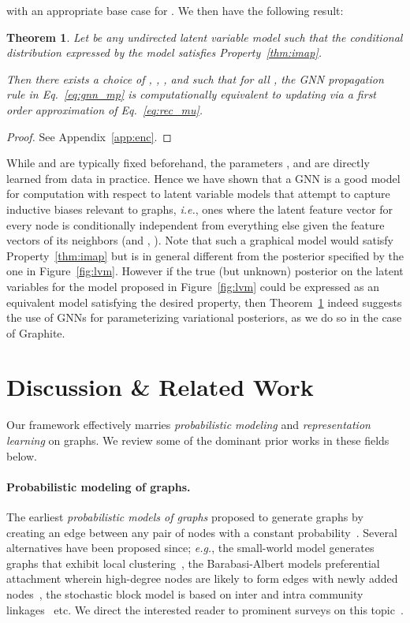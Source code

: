 \documentclass{article}
\newcommand{\name}{Graphite}
\newtheorem{theorem}{Theorem}
\begin{document}
with an appropriate base case for  . 
We then have the following result:

\begin{theorem}\label{thm:gnn_imap}
Let  be any undirected latent variable model such that the conditional distribution  expressed by the model satisfies Property~\ref{thm:imap}. 

Then there exists a choice of , , 
, 
and  such that for all , the GNN propagation rule in Eq.~\eqref{eq:gnn_mp} is computationally equivalent to updating  via a first order approximation of Eq.~\eqref{eq:rec_mu}.  
\end{theorem}
\begin{proof}
See Appendix~\ref{app:enc}.
\end{proof}

While  and  are typically fixed beforehand, the parameters , 
and  are directly learned from data in practice. Hence we have shown that a GNN is a good model for computation with respect to latent variable models that attempt to capture inductive biases relevant to graphs, \textit{i.e.}, ones where the latent feature vector for every node is conditionally independent from everything else given the feature vectors of its neighbors (and , ). Note that such a graphical model would satisfy Property~\ref{thm:imap} but is in general different from the posterior specified by the one in Figure~\ref{fig:lvm}. However if the true (but unknown) posterior on the latent variables for the model proposed in Figure~\ref{fig:lvm} could be expressed as an equivalent model satisfying the desired property, then Theorem~\ref{thm:gnn_imap} indeed suggests the use of GNNs for parameterizing variational posteriors, as we do so in the case of \name{}.
 \section{Discussion \& Related Work}\label{sec:related}


Our framework effectively marries \textit{probabilistic modeling} and  \textit{representation learning} on graphs. We review some of the dominant prior works in these fields below.

\paragraph{Probabilistic modeling of graphs.}
The earliest \textit{probabilistic models of graphs} proposed to generate graphs by creating an edge between any pair of nodes with a constant probability~\citep{erdos1959random}. Several alternatives have been proposed since; \textit{e.g.}, the small-world model generates graphs that exhibit local clustering~\citep{watts1998collective}, the Barabasi-Albert models preferential attachment wherein high-degree nodes are likely to form edges with newly added nodes~\citep{barabasi1999random}, the stochastic block model is based on inter and intra community linkages~\citep{holland1983stochastic} etc.
 We direct the interested reader to prominent surveys on this topic~\citep{newman2003structure,mitzenmacher2004brief,chakrabarti2006graph}.
\end{document}
